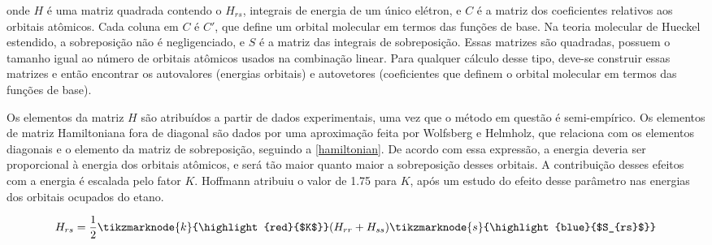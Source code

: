 \noindent onde $H$ é uma matriz quadrada contendo o $H_{rs}$, integrais de energia de um único elétron, e $C$ é a matriz dos coeficientes relativos aos orbitais atômicos. Cada coluna em $C$ é $C'$, que define um orbital molecular em termos das funções de base. Na teoria molecular de Hueckel estendido, a sobreposição não é negligenciado, e $S$ é a matriz das integrais de sobreposição. Essas matrizes são quadradas, possuem o tamanho igual ao número de orbitais atômicos usados na combinação linear. Para qualquer cálculo desse tipo, deve-se construir essas matrizes e então encontrar os autovalores (energias orbitais) e autovetores (coeficientes que definem o orbital molecular em termos das funções de base).

Os elementos da matriz $H$ são atribuídos a partir de dados experimentais, uma vez que o método em questão é semi-empírico. Os elementos de matriz Hamiltoniana fora de diagonal são dados por uma aproximação feita por Wolfsberg e Helmholz, que relaciona com os elementos diagonais e o elemento da matriz de sobreposição, seguindo a \autoref{hamiltonian}. De acordo com essa expressão, a energia deveria ser proporcional à energia dos orbitais atômicos, e será tão maior quanto maior a sobreposição desses orbitais. A contribuição desses efeitos com a energia é escalada pelo fator $K$. Hoffmann \autocite{Hoffmann1963} atribuiu o valor de 1.75 para $K$, após um estudo do efeito desse parâmetro nas energias dos orbitais ocupados do etano.

\begin{figure}[htb]
\label{hamiltonian}
    \vspace{2\baselineskip}
\begin{equation}
    H_{rs} = \frac{1}{2} \tikzmarknode{k}{\highlight{red}{$K$}}(H_{rr} + H_{ss}) \tikzmarknode{s}{\highlight{blue}{$S_{rs}$}}
\end{equation}
\end{figure}

